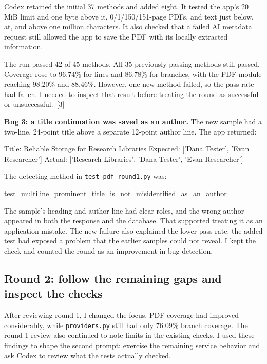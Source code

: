 \documentclass[10pt,letterpaper]{article}
\newcommand{\reportsubsection}[1]{\subsection*{\color{black}#1}}
\begin{document}
Codex retained the initial 37 methods and added eight. It tested the app's 20 MiB limit and one byte above it, 0/1/150/151-page PDFs, and text just below, at, and above one million characters. It also checked that a failed AI metadata request still allowed the app to save the PDF with its locally extracted information.

The run passed 42 of 45 methods. All 35 previously passing methods still passed. Coverage rose to 96.74\% for lines and 86.78\% for branches, with the PDF module reaching 98.20\% and 88.46\%. However, one new method failed, so the pass rate had fallen. I needed to inspect that result before treating the round as successful or unsuccessful.~[3]

\begin{minipage}{\linewidth}
\textbf{Bug 3: a title continuation was saved as an author.}
The new sample had a two-line, 24-point title above a separate 12-point author line. The app returned:
\begin{reportcode}
Title:    Reliable Storage for
          Research Libraries
Expected: ['Dana Tester', 'Evan Researcher']
Actual:   ['Research Libraries', 'Dana Tester', 'Evan Researcher']
\end{reportcode}
\end{minipage}

\begin{minipage}{\linewidth}
The detecting method in \texttt{test\_pdf\_round1.py} was:
\begin{reportcode}
test_multiline_prominent_title_is_not_misidentified_as_an_author
\end{reportcode}
\end{minipage}

The sample's heading and author line had clear roles, and the wrong author appeared in both the response and the database. That supported treating it as an application mistake. The new failure also explained the lower pass rate: the added test had exposed a problem that the earlier samples could not reveal. I kept the check and counted the round as an improvement in bug detection.

\reportsubsection{Round 2: follow the remaining gaps and inspect the checks}

After reviewing round 1, I changed the focus. PDF coverage had improved considerably, while \texttt{providers.py} still had only 76.09\% branch coverage. The round 1 review also continued to note limits in the existing checks. I used these findings to shape the second prompt: exercise the remaining service behavior and ask Codex to review what the tests actually checked.
\end{document}
